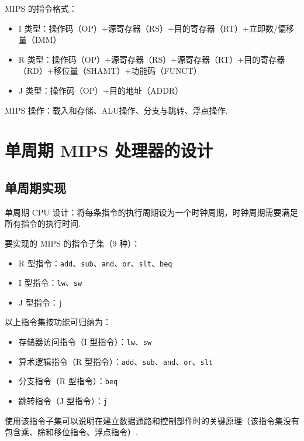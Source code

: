 \documentclass[cn, hazy, blue, normal, 12pt]{elegantnote}
\begin{document}
MIPS 的指令格式：

\begin{itemize}
    \item I 类型：操作码（OP）+源寄存器（RS）+目的寄存器（RT）+立即数/偏移量（IMM）
    \item R 类型：操作码（OP）+源寄存器（RS）+源寄存器（RT）+目的寄存器（RD）+移位量（SHAMT）+功能码（FUNCT）
    \item J 类型：操作码（OP）+目的地址（ADDR）
\end{itemize}

MIPS 操作：载入和存储、ALU操作、分支与跳转、浮点操作.

\section{单周期 MIPS 处理器的设计}

\subsection{单周期实现}

单周期 CPU 设计：将每条指令的执行周期设为一个时钟周期，时钟周期需要满足所有指令的执行时间.

要实现的 MIPS 的指令子集（9 种）：

\begin{itemize}
    \item R 型指令：\lstinline{add}、\lstinline{sub}、\lstinline{and}、\lstinline{or}、\lstinline{slt}、\lstinline{beq}
    \item I 型指令：\lstinline{lw}、\lstinline{sw}
    \item J 型指令：\lstinline{j}
\end{itemize}

以上指令集按功能可归纳为：

\begin{itemize}
    \item 存储器访问指令（I 型指令）：\lstinline{lw}、\lstinline{sw}
    \item 算术逻辑指令（R 型指令）：\lstinline{add}、\lstinline{sub}、\lstinline{and}、\lstinline{or}、\lstinline{slt}
    \item 分支指令（R 型指令）：\lstinline{beq}
    \item 跳转指令（J 型指令）：\lstinline{j}
\end{itemize}

使用该指令子集可以说明在建立数据通路和控制部件时的关键原理（该指令集没有包含乘、除和移位指令、浮点指令）.
\end{document}
